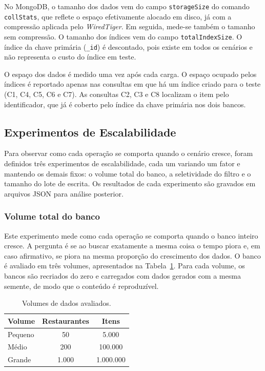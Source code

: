 No MongoDB, o tamanho dos dados vem do campo \texttt{storageSize} do comando
\texttt{collStats}, que reflete o espaço efetivamente alocado em disco, já com a
compressão aplicada pelo \textit{WiredTiger}. Em seguida, mede-se também o
tamanho sem compressão. O tamanho dos
índices vem do campo \texttt{totalIndexSize}. O índice da chave primária
(\texttt{\_id}) é descontado, pois existe em todos os cenários e não representa
o custo do índice em teste. 

O espaço dos dados é medido uma vez após cada carga. O espaço ocupado pelos índices é reportado apenas nas consultas em que há um índice criado
para o teste (C1, C4, C5, C6 e C7). As consultas C2, C3 e C8 localizam o item pelo
identificador, que já é coberto pelo índice da chave primária nos dois bancos.


\subsection{Experimentos de Escalabilidade}

Para observar como cada operação se comporta quando o cenário cresce, foram
definidos três experimentos de escalabilidade, cada um variando um fator e
mantendo os demais fixos: o volume total do banco, a seletividade do filtro e o
tamanho do lote de escrita. Os
resultados de cada experimento são gravados em arquivos JSON para análise
posterior.

\subsubsection{Volume total do banco}

Este experimento mede como cada operação se comporta quando o banco inteiro
cresce. A pergunta é se ao buscar exatamente a mesma coisa o tempo piora e, em
caso afirmativo, se piora na mesma proporção do crescimento dos dados. O banco é
avaliado em três volumes, apresentados na Tabela~\ref{tab:volumes}. Para cada volume, os bancos são recriados do zero e carregados com dados gerados com a mesma semente, de modo que o conteúdo é reproduzível.

\begin{table}[H]
    \centering
    \renewcommand{\arraystretch}{1.1}
    \caption{Volumes de dados avaliados.}
    \label{tab:volumes}
    \footnotesize
    \begin{tabular}{|l|c|c|}
        \hline
        \textbf{Volume} & \textbf{Restaurantes} & \textbf{Itens} \\ \hline
        Pequeno & 50 & 5.000 \\ \hline
        Médio & 200 & 100.000 \\ \hline
        Grande & 1.000 & 1.000.000 \\ \hline
    \end{tabular}
    \vspace{0.4em}
\end{table}

